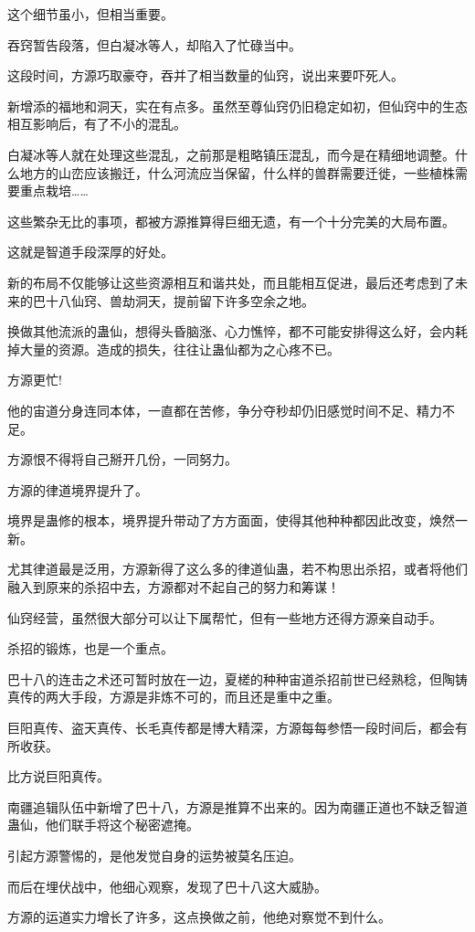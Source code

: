 \begin{this_body}
这个细节虽小，但相当重要。

吞窍暂告段落，但白凝冰等人，却陷入了忙碌当中。

这段时间，方源巧取豪夺，吞并了相当数量的仙窍，说出来要吓死人。

新增添的福地和洞天，实在有点多。虽然至尊仙窍仍旧稳定如初，但仙窍中的生态相互影响后，有了不小的混乱。

白凝冰等人就在处理这些混乱，之前那是粗略镇压混乱，而今是在精细地调整。什么地方的山峦应该搬迁，什么河流应当保留，什么样的兽群需要迁徙，一些植株需要重点栽培……

这些繁杂无比的事项，都被方源推算得巨细无遗，有一个十分完美的大局布置。

这就是智道手段深厚的好处。

新的布局不仅能够让这些资源相互和谐共处，而且能相互促进，最后还考虑到了未来的巴十八仙窍、兽劫洞天，提前留下许多空余之地。

换做其他流派的蛊仙，想得头昏脑涨、心力憔悴，都不可能安排得这么好，会内耗掉大量的资源。造成的损失，往往让蛊仙都为之心疼不已。

方源更忙!

他的宙道分身连同本体，一直都在苦修，争分夺秒却仍旧感觉时间不足、精力不足。

方源恨不得将自己掰开几份，一同努力。

方源的律道境界提升了。

境界是蛊修的根本，境界提升带动了方方面面，使得其他种种都因此改变，焕然一新。

尤其律道最是泛用，方源新得了这么多的律道仙蛊，若不构思出杀招，或者将他们融入到原来的杀招中去，方源都对不起自己的努力和筹谋！

仙窍经营，虽然很大部分可以让下属帮忙，但有一些地方还得方源亲自动手。

杀招的锻炼，也是一个重点。

巴十八的连击之术还可暂时放在一边，夏槎的种种宙道杀招前世已经熟稔，但陶铸真传的两大手段，方源是非炼不可的，而且还是重中之重。

巨阳真传、盗天真传、长毛真传都是博大精深，方源每每参悟一段时间后，都会有所收获。

比方说巨阳真传。

南疆追辑队伍中新增了巴十八，方源是推算不出来的。因为南疆正道也不缺乏智道蛊仙，他们联手将这个秘密遮掩。

引起方源警惕的，是他发觉自身的运势被莫名压迫。

而后在埋伏战中，他细心观察，发现了巴十八这大威胁。

方源的运道实力增长了许多，这点换做之前，他绝对察觉不到什么。


\end{this_body}
